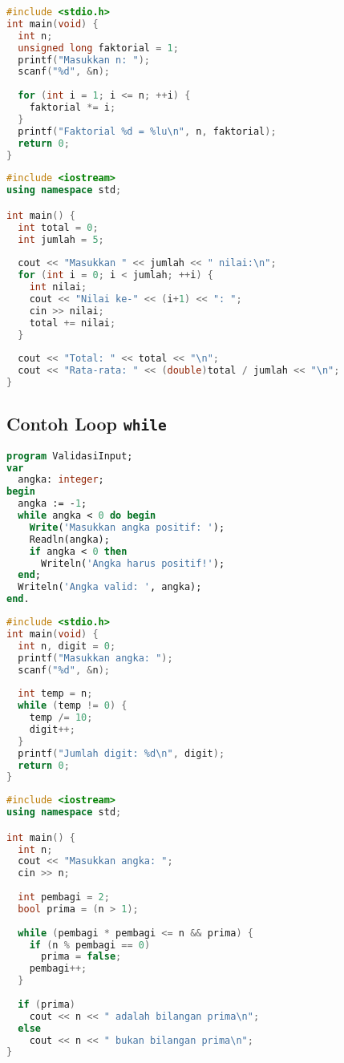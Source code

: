 \documentclass[../main.tex]{subfiles}
\begin{document}
\begin{lstlisting}[language=C, caption={Hitung faktorial dengan for (C)}]
#include <stdio.h>
int main(void) {
  int n;
  unsigned long faktorial = 1;
  printf("Masukkan n: ");
  scanf("%d", &n);
  
  for (int i = 1; i <= n; ++i) {
    faktorial *= i;
  }
  printf("Faktorial %d = %lu\n", n, faktorial);
  return 0;
}
\end{lstlisting}

\begin{lstlisting}[language=C++, caption={Loop for dengan hitung total (C++)}]
#include <iostream>
using namespace std;

int main() {
  int total = 0;
  int jumlah = 5;
  
  cout << "Masukkan " << jumlah << " nilai:\n";
  for (int i = 0; i < jumlah; ++i) {
    int nilai;
    cout << "Nilai ke-" << (i+1) << ": ";
    cin >> nilai;
    total += nilai;
  }
  
  cout << "Total: " << total << "\n";
  cout << "Rata-rata: " << (double)total / jumlah << "\n";
}
\end{lstlisting}

\subsection{Contoh Loop \texttt{while}}
\begin{lstlisting}[language=Pascal, caption={Input validasi dengan while (Pascal)}]
program ValidasiInput;
var
  angka: integer;
begin
  angka := -1;
  while angka < 0 do begin
    Write('Masukkan angka positif: ');
    Readln(angka);
    if angka < 0 then
      Writeln('Angka harus positif!');
  end;
  Writeln('Angka valid: ', angka);
end.
\end{lstlisting}

\begin{lstlisting}[language=C, caption={Hitung digit dengan while (C)}]
#include <stdio.h>
int main(void) {
  int n, digit = 0;
  printf("Masukkan angka: ");
  scanf("%d", &n);
  
  int temp = n;
  while (temp != 0) {
    temp /= 10;
    digit++;
  }
  printf("Jumlah digit: %d\n", digit);
  return 0;
}
\end{lstlisting}

\begin{lstlisting}[language=C++, caption={Hitung bilangan prima dengan while (C++)}]
#include <iostream>
using namespace std;

int main() {
  int n;
  cout << "Masukkan angka: ";
  cin >> n;
  
  int pembagi = 2;
  bool prima = (n > 1);
  
  while (pembagi * pembagi <= n && prima) {
    if (n % pembagi == 0)
      prima = false;
    pembagi++;
  }
  
  if (prima)
    cout << n << " adalah bilangan prima\n";
  else
    cout << n << " bukan bilangan prima\n";
}
\end{lstlisting}
\end{document}
